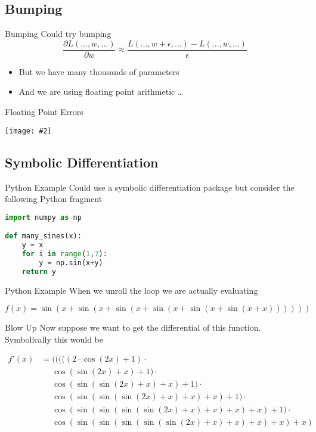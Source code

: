 \documentclass{beamer}
\newcommand {\framedgraphic}[2] {
    \begin{frame}{#1}
        \begin{center}
            \texttt{[image: \#2]}
        \end{center}
    \end{frame}
}
\begin{document}
\subsection{Bumping}

\begin{frame}{Bumping}
Could try bumping
$$
\frac{\partial L(\ldots, w, \ldots)}{\partial w} \approx \frac{L(\ldots, w + \epsilon, \ldots) - L(\ldots, w, \ldots)}{\epsilon}
$$
\begin{itemize}
\item
But we have many thousands of parameters
\item
And we are using floating point arithmetic \ldots
\end{itemize}
\end{frame}

\framedgraphic{Floating Point Errors}{diagrams/13a2bd186a0e123f040da9491fa98684.png}

\subsection{Symbolic Differentiation}

\begin{frame}[fragile]{Python Example}
  Could use a symbolic differentiation package but consider the
  following Python fragment
\begin{lstlisting}[language=Python]
import numpy as np

def many_sines(x):
    y = x
    for i in range(1,7):
        y = np.sin(x+y)
    return y
\end{lstlisting}
\end{frame}

\begin{frame}[fragile]{Python Example}
When we unroll the loop we are actually evaluating

$$
f(x) = \sin(x + \sin(x + \sin(x + \sin(x + \sin(x + \sin(x + x))))))
$$

\end{frame}

\begin{frame}[fragile]{Blow Up}
Now suppose we want to get the differential of this
function. Symbolically this would be

$$
\begin{aligned}
f'(x) &=           (((((2\cdot \cos(2x)+1)\cdot \\
      &\phantom{=} \cos(\sin(2x)+x)+1)\cdot \\
      &\phantom{=} \cos(\sin(\sin(2x)+x)+x)+1)\cdot \\
      &\phantom{=} \cos(\sin(\sin(\sin(2x)+x)+x)+x)+1)\cdot \\
      &\phantom{=} \cos(\sin(\sin(\sin(\sin(2x)+x)+x)+x)+x)+1)\cdot \\
      &\phantom{=} \cos(\sin(\sin(\sin(\sin(\sin(2x)+x)+x)+x)+x)+x)
\end{aligned}
$$
\end{frame}
\end{document}
